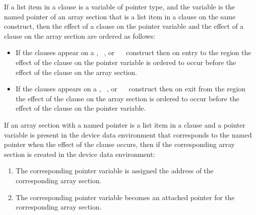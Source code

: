\begin{ccppspecific}
If a list item in a  clause is a variable of pointer type, and the
variable is the named pointer of an array section that is a list item in a
 clause on the same construct, then the effect of a  clause
on the pointer variable and the effect of a  clause on the array section are
ordered as follows:

\begin{itemize}

\item If the  clauses appear on a ,
~, or ~~ construct
then on entry to the region the effect of the  clause on the pointer
variable is ordered to occur before the effect of the  clause on
the array section.

\item If the  clauses appears on a ,
~, or ~~ construct
then on exit from the region the effect of the  clause on the array
section is ordered to occur before the effect of the  clause on the
pointer variable.

\end{itemize}

If an array section with a named pointer is a list item in a  clause
and a pointer variable is present in the device data environment that
corresponds to the named pointer when the effect of the  clause
occurs, then if the corresponding array section is created in the device data
environment: \begin{enumerate}

\item The corresponding pointer variable is assigned the address of the
corresponding array section.

\item The corresponding pointer variable becomes an attached pointer
for the corresponding array section.

\end{enumerate}

\end{ccppspecific}

